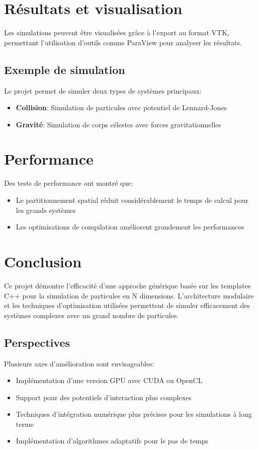 \documentclass[12pt,a4paper]{article}
\begin{document}
\section{Résultats et visualisation}

Les simulations peuvent être visualisées grâce à l'export au format VTK, permettant l'utilisation d'outils comme ParaView pour analyser les résultats.

\subsection{Exemple de simulation}

Le projet permet de simuler deux types de systèmes principaux:

\begin{itemize}
    \item \textbf{Collision}: Simulation de particules avec potentiel de Lennard-Jones
    \item \textbf{Gravité}: Simulation de corps célestes avec forces gravitationnelles
\end{itemize}

\section{Performance}

Des tests de performance ont montré que:

\begin{itemize}
    \item Le partitionnement spatial réduit considérablement le temps de calcul pour les grands systèmes
    \item Les optimisations de compilation améliorent grandement les performances
\end{itemize}

\section{Conclusion}

Ce projet démontre l'efficacité d'une approche générique basée sur les templates C++ pour la simulation de particules en N dimensions. L'architecture modulaire et les techniques d'optimisation utilisées permettent de simuler efficacement des systèmes complexes avec un grand nombre de particules.

\subsection{Perspectives}

Plusieurs axes d'amélioration sont envisageables:

\begin{itemize}
    \item Implémentation d'une version GPU avec CUDA ou OpenCL
    \item Support pour des potentiels d'interaction plus complexes
    \item Techniques d'intégration numérique plus précises pour les simulations à long terme
    \item Implémentation d'algorithmes adaptatifs pour le pas de temps
\end{itemize}
\end{document}
